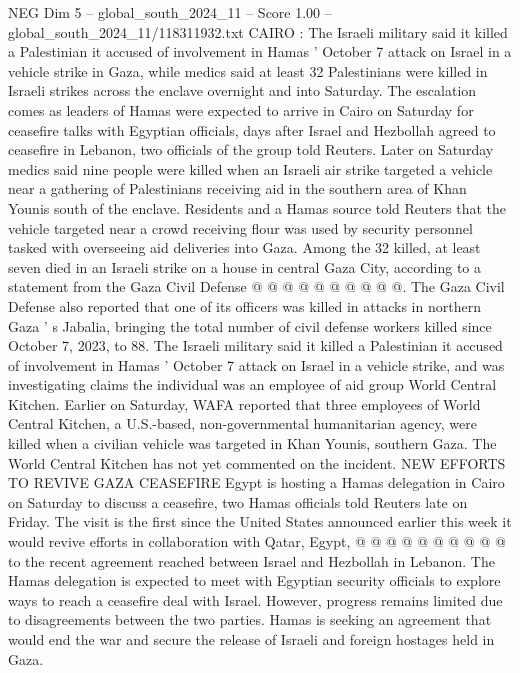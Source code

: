 \begin{textsample}{NEG Dim 5 – global\_south\_2024\_11 – Score 1.00 – global\_south\_2024\_11/118311932.txt}  \label{ex:f5_neg_439}
CAIRO : The Israeli military said it killed a Palestinian it accused of involvement in Hamas ' October 7 attack on Israel in a vehicle strike in Gaza, while medics said at least 32 Palestinians were killed in Israeli strikes across the enclave overnight and into Saturday.
The escalation comes as leaders of Hamas were expected to arrive in Cairo on Saturday for ceasefire talks with Egyptian officials, days after Israel and Hezbollah agreed to ceasefire in Lebanon, two officials of the group told Reuters.
Later on Saturday medics said nine people were killed when an Israeli air strike targeted a vehicle near a gathering of Palestinians receiving aid in the southern area of Khan Younis south of the enclave.
Residents and a Hamas source told Reuters that the vehicle targeted near a crowd receiving flour was used by security personnel tasked with overseeing aid deliveries into Gaza.
Among the 32 killed, at least seven died in an Israeli strike on a house in central Gaza City, according to a statement from the Gaza Civil Defense @ @ @ @ @ @ @ @ @ @.
The Gaza Civil Defense also reported that one of its officers was killed in attacks in northern Gaza ' s Jabalia, bringing the total number of civil defense workers killed since October 7, 2023, to 88.
The Israeli military said it killed a Palestinian it accused of involvement in Hamas ' October 7 attack on Israel in a vehicle strike, and was investigating claims the individual was an employee of aid group World Central Kitchen.
Earlier on Saturday, WAFA reported that three employees of World Central Kitchen, a U.S.-based, non-governmental humanitarian agency, were killed when a civilian vehicle was targeted in Khan Younis, southern Gaza.
The World Central Kitchen has not yet commented on the incident.
NEW EFFORTS TO REVIVE GAZA CEASEFIRE Egypt is hosting a Hamas delegation in Cairo on Saturday to discuss a ceasefire, two Hamas officials told Reuters late on Friday.
The visit is the first since the United States announced earlier this week it would revive efforts in collaboration with Qatar, Egypt, @ @ @ @ @ @ @ @ @ @ to the recent agreement reached between Israel and Hezbollah in Lebanon.
The Hamas delegation is expected to meet with Egyptian security officials to explore ways to reach a ceasefire deal with Israel.
However, progress remains limited due to disagreements between the two parties.
Hamas is seeking an agreement that would end the war and secure the release of Israeli and foreign hostages held in Gaza.

\end{textsample}

